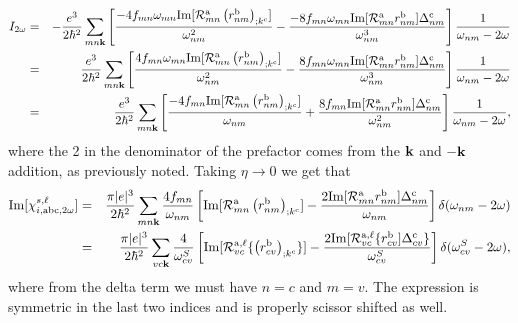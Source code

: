 \documentclass[floatfix,prb,aps,superscriptaddress,11pt,preprint]{revtex4}
\begin{document}
\begin{eqnarray}\label{2wchii}
I_{2\omega}&=&
-\frac{e^3}{2\hbar^2}\sum_{mn\mathbf{k}}
\left[
\frac{-4f_{mn}\omega_{mn}\mathrm{Im}[{\cal R}^{\mathrm{a}}_{mn}\left(r^{\mathrm{b}}_{nm}\right)_{;k^{\mathrm{c}}}]}{\omega^2_{nm}}
-
\frac{-8f_{mn}\omega_{mn}\mathrm{Im}[{\cal R}^{\mathrm{a}}_{mn}r^{\mathrm{b}}_{nm}]\Delta^{\mathrm{c}}_{nm}}{\omega^3_{nm}}
\right]\frac{1}{\omega_{nm}-2\omega}
\nonumber\\
&=&
\frac{e^3}{2\hbar^2}\sum_{mn\mathbf{k}}
\left[
\frac{4f_{mn}\omega_{mn}\mathrm{Im}[{\cal R}^{\mathrm{a}}_{mn}\left(r^{\mathrm{b}}_{nm}\right)_{;k^{\mathrm{c}}}]}{\omega^2_{nm}}
-
\frac{8f_{mn}\omega_{mn}\mathrm{Im}[{\cal R}^{\mathrm{a}}_{mn}r^{\mathrm{b}}_{nm}]\Delta^{\mathrm{c}}_{nm}}{\omega^3_{nm}}
\right]\frac{1}{\omega_{nm}-2\omega}
\nonumber\\
&=&
\frac{e^3}{2\hbar^2}\sum_{mn\mathbf{k}}
\left[
\frac{-4f_{mn}\mathrm{Im}[{\cal R}^{\mathrm{a}}_{mn}\left(r^{\mathrm{b}}_{nm}\right)_{;k^{\mathrm{c}}}]}{\omega_{nm}}
+
\frac{8f_{mn}\mathrm{Im}[{\cal R}^{\mathrm{a}}_{mn}r^{\mathrm{b}}_{nm}]\Delta^{\mathrm{c}}_{nm}}{\omega^2_{nm}}
\right]\frac{1}{\omega_{nm}-2\omega}
,
\end{eqnarray}
where the 2 in the denominator of the prefactor
comes from the $\mathbf{k}$ and $-\mathbf{k}$ addition, as previously noted.
Taking $\eta\to 0$ we get that
\begin{eqnarray}\label{imchi2w}
\mathrm{Im}[\chi_{i,\mathrm{a}\mathrm{b}\mathrm{c},2\omega}^{s,\ell}]
&=&
\frac{\pi|e|^3}{2\hbar^2}\sum_{mn\mathbf{k}}
\frac{4f_{mn}}{\omega_{nm}}
\left[
\mathrm{Im}[{\cal R}^{\mathrm{a}}_{mn}\left(r^{\mathrm{b}}_{nm}\right)_{;k^{\mathrm{c}}}]
-
\frac{2\mathrm{Im}[{\cal R}^{\mathrm{a}}_{mn}r^{\mathrm{b}}_{nm}]\Delta^{\mathrm{c}}_{nm}}{\omega_{nm}}
\right]\delta(\omega_{nm}-2\omega)
\nonumber \\
&=&
\frac{\pi|e|^3}{2\hbar^2}\sum_{vc\mathbf{k}}
\frac{4}{\omega^S_{cv}}
\left[
\mathrm{Im}[{\cal R}^{\mathrm{a},\ell}_{vc}\{\left(r^{\mathrm{b}}_{cv}\right)_{;k^{\mathrm{c}}}\}]
-
\frac{2\mathrm{Im}[{\cal R}^{\mathrm{a},\ell}_{vc}\{r^{\mathrm{b}}_{cv}]\Delta^{\mathrm{c}}_{cv}\}}{\omega^S_{cv}}
\right]\delta(\omega^S_{cv}-2\omega)
,
\end{eqnarray} 
where from the delta term we must have $n=c$ and $m=v$. The expression
is symmetric in the last two indices and is properly scissor shifted
as well. 
\end{document}

